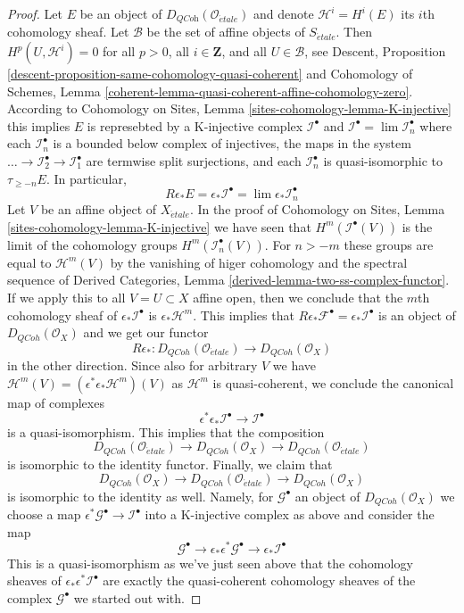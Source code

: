 \begin{proof}
\medskip\noindent
Let $E$ be an object of $D_{\textit{QCoh}}(\mathcal{O}_{\acute{e}tale})$
and denote $\mathcal{H}^i = H^i(E)$ its $i$th cohomology
sheaf. Let $\mathcal{B}$ be the set of affine objects of $S_{\acute{e}tale}$.
Then $H^p(U, \mathcal{H}^i) = 0$ for all $p > 0$, all $i \in \mathbf{Z}$,
and all $U \in \mathcal{B}$, see
Descent, Proposition \ref{descent-proposition-same-cohomology-quasi-coherent}
and
Cohomology of Schemes, Lemma
\ref{coherent-lemma-quasi-coherent-affine-cohomology-zero}.
According to
Cohomology on Sites, Lemma \ref{sites-cohomology-lemma-K-injective}
this implies $E$ is represebted by a K-injective complex
$\mathcal{I}^\bullet$ and
$\mathcal{I}^\bullet = \lim \mathcal{I}_n^\bullet$ where
each $\mathcal{I}_n^\bullet$ is a bounded below complex of injectives,
the maps in the system
$\ldots \to \mathcal{I}_2^\bullet \to \mathcal{I}_1^\bullet$
are termwise split surjections, and each $\mathcal{I}_n^\bullet$ is
quasi-isomorphic to $\tau_{\geq -n}E$.
In particular,
$$
R\epsilon_*E = \epsilon_*\mathcal{I}^\bullet =
\lim \epsilon_*\mathcal{I}_n^\bullet
$$
Let $V$ be an affine object of $X_{\acute{e}tale}$. In the proof of
Cohomology on Sites, Lemma \ref{sites-cohomology-lemma-K-injective}
we have seen that $H^m(\mathcal{I}^\bullet(V))$ is
the limit of the cohomology groups $H^m(\mathcal{I}_n^\bullet(V))$.
For $n > -m$ these groups are equal to $\mathcal{H}^m(V)$
by the vanishing of higer cohomology and the spectral sequence of
Derived Categories, Lemma \ref{derived-lemma-two-ss-complex-functor}.
If we apply this to all $V = U \subset X$ affine open, then we conclude that
the $m$th cohomology sheaf of $\epsilon_*\mathcal{I}^\bullet$ is
$\epsilon_*\mathcal{H}^m$. This implies that
$R\epsilon_*\mathcal{F}^\bullet = \epsilon_*\mathcal{I}^\bullet$
is an object of $D_{QCoh}(\mathcal{O}_X)$ and we get our functor
$$
R\epsilon_* :
D_{QCoh}(\mathcal{O}_{\acute{e}tale})
\longrightarrow
D_{QCoh}(\mathcal{O}_X)
$$
in the other direction. Since also for arbitrary $V$ we have
$\mathcal{H}^m(V) = (\epsilon^*\epsilon_*\mathcal{H}^m)(V)$
as $\mathcal{H}^m$ is quasi-coherent, we conclude the canonical map of
complexes
$$
\epsilon^*\epsilon_*\mathcal{I}^\bullet \longrightarrow \mathcal{I}^\bullet
$$
is a quasi-isomorphism. This implies that the composition
$$
D_{QCoh}(\mathcal{O}_{\acute{e}tale})
\longrightarrow
D_{QCoh}(\mathcal{O}_X)
\longrightarrow
D_{QCoh}(\mathcal{O}_{\acute{e}tale})
$$
is isomorphic to the identity functor. Finally, we claim that
$$
D_{QCoh}(\mathcal{O}_X)
\longrightarrow
D_{QCoh}(\mathcal{O}_{\acute{e}tale})
\longrightarrow
D_{QCoh}(\mathcal{O}_X)
$$
is isomorphic to the identity as well. Namely, for $\mathcal{G}^\bullet$
an object of $D_{QCoh}(\mathcal{O}_X)$ we choose a map
$\epsilon^*\mathcal{G}^\bullet \to \mathcal{I}^\bullet$
into a K-injective complex as above and consider the map
$$
\mathcal{G}^\bullet \to \epsilon_*\epsilon^*\mathcal{G}^\bullet \to
\epsilon_*\mathcal{I}^\bullet
$$
This is a quasi-isomorphism as we've just seen above that the cohomology
sheaves of $\epsilon_*\epsilon^*\mathcal{I}^\bullet$ are exactly the
quasi-coherent cohomology sheaves of the complex $\mathcal{G}^\bullet$
we started out with.
\end{proof}
